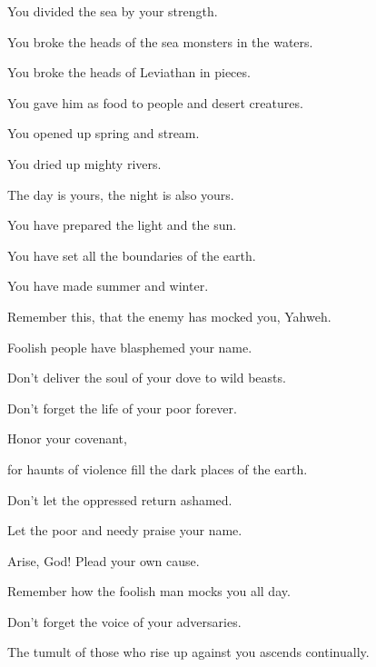 {\par }{\Q {}You divided the sea by your strength.
\par }{\QB You broke the heads of the sea monsters in the waters.
\par }{\Q {}You broke the heads of Leviathan in pieces.
\par }{\QB You gave him as food to people and desert creatures.
\par }{\Q {}You opened up spring and stream.
\par }{\QB You dried up mighty rivers.
\par }{\Q {}The day is yours, the night is also yours.
\par }{\QB You have prepared the light and the sun.
\par }{\Q {}You have set all the boundaries of the earth.
\par }{\QB You have made summer and winter.
\par }{\BB \par }{\Q {}Remember this, that the enemy has mocked you, Yahweh.
\par }{\QB Foolish people have blasphemed your name.
\par }{\Q {}Don’t deliver the soul of your dove to wild beasts.
\par }{\QB Don’t forget the life of your poor forever.
\par }{\Q {}Honor your covenant,
\par }{\QB for haunts of violence fill the dark places of the earth.
\par }{\Q {}Don’t let the oppressed return ashamed.
\par }{\QB Let the poor and needy praise your name.
\par }{\Q {}Arise, God! Plead your own cause.
\par }{\QB Remember how the foolish man mocks you all day.
\par }{\Q {}Don’t forget the voice of your adversaries.
\par }{\QB The tumult of those who rise up against you ascends continually.
\par }{\BB \par }
